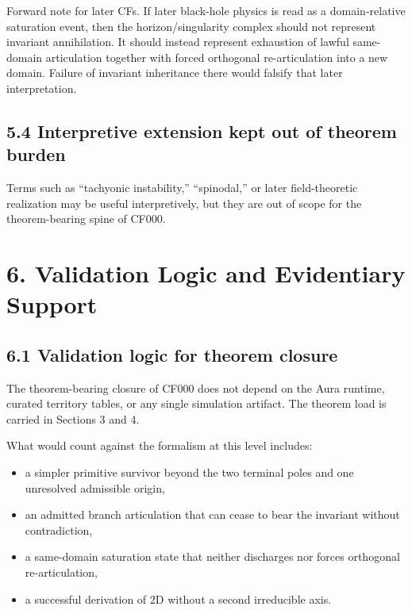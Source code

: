 \documentclass[11pt]{article}
\begin{document}
Forward note for later CFs. If later black-hole physics is read as a domain-relative saturation event, then the horizon/singularity complex should not represent invariant annihilation. It should instead represent exhaustion of lawful same-domain articulation together with forced orthogonal re-articulation into a new domain. Failure of invariant inheritance there would falsify that later interpretation.

\subsection{5.4 Interpretive extension kept out of theorem burden}\label{interpretive-extension-kept-out-of-theorem-burden}

Terms such as ``tachyonic instability,'' ``spinodal,'' or later field-theoretic realization may be useful interpretively, but they are out of scope for the theorem-bearing spine of CF000.

\section{6. Validation Logic and Evidentiary Support}\label{validation-logic-and-evidentiary-support}

\subsection{6.1 Validation logic for theorem closure}\label{validation-logic-for-theorem-closure}

The theorem-bearing closure of CF000 does not depend on the Aura runtime, curated territory tables, or any single simulation artifact. The theorem load is carried in Sections 3 and 4.

What would count against the formalism at this level includes:

\begin{itemize}
\item
  a simpler primitive survivor beyond the two terminal poles and one unresolved admissible origin,
\item
  an admitted branch articulation that can cease to bear the invariant without contradiction,
\item
  a same-domain saturation state that neither discharges nor forces orthogonal re-articulation,
\item
  a successful derivation of 2D without a second irreducible axis.
\end{itemize}
\end{document}
